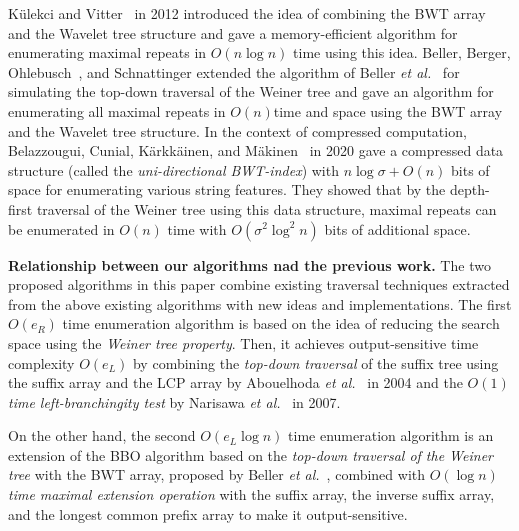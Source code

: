 Külekci and Vitter~\cite{kulekci2011efficient} in 2012 introduced the idea of combining the BWT array and the Wavelet tree structure and gave a memory-efficient algorithm for enumerating maximal repeats in $O(n \log n)$ time using this idea. Beller, Berger, Ohlebusch~\cite{beller:berger2012space:efficient:bbo}, and Schnattinger extended the algorithm of Beller \textit{et al.}~\cite{bellergogohlebusch2013computing} for simulating the top-down traversal of the Weiner tree and gave an algorithm for enumerating all maximal repeats in $O(n)$time and space using the BWT array and the Wavelet tree structure.
In the context of compressed computation, Belazzougui, Cunial, K\"{a}rkk\"{a}inen, and M\"{a}kinen~\cite{belazzougui2020linear} in 2020 gave a compressed data structure (called the \textit{uni-directional BWT-index}) with $n \log\sigma + O(n)$ bits of space for enumerating various string features. They showed that by the depth-first traversal of the Weiner tree using this data structure, maximal repeats can be enumerated in $O(n)$ time with $O(\sigma^2 \log^2 n)$ bits of additional space.

\textbf{Relationship between our algorithms nad the previous work.} The two proposed algorithms in this paper combine existing traversal techniques extracted from the above existing algorithms with new ideas and implementations. The first $O(e_R)$ time enumeration algorithm is based on the idea of reducing the search space using the \textit{Weiner tree property}. Then, it achieves output-sensitive time complexity $O(e_L)$ by combining the \textit{top-down traversal} of the suffix tree using the suffix array and the LCP array by Abouelhoda \textit{et al.}~\cite{abouelhoda2004replacing} in 2004 and the \textit{$O(1)$ time left-branchingity test} by Narisawa \textit{et al.}~\cite{narisawa2007efficient} in 2007. 

On the other hand, the second $O(e_L \log n)$ time enumeration algorithm is an extension of the BBO algorithm based on the \textit{top-down traversal of the Weiner tree} with the BWT array, proposed by Beller \textit{et al.}~\cite{beller:berger2012space:efficient:bbo}, combined with \textit{$O(\log n)$ time maximal extension operation} with the suffix array, the inverse suffix array, and the longest common prefix array to make it output-sensitive. 

